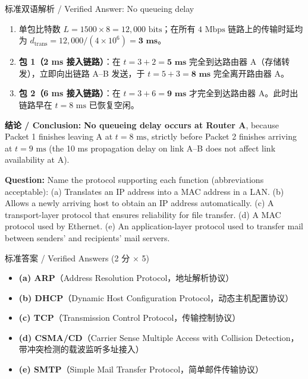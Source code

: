 \begin{StudySolution}{标准双语解析 / Verified Answer: No queueing delay}
\begin{enumerate}
\item 单包比特数 $L = 1500 \times 8 = 12{,}000\text{ bits}$；在所有 $4\text{ Mbps}$ 链路上的传输时延均为 $d_{\text{trans}} = 12{,}000 / (4\times 10^6) = \mathbf{3\text{ ms}}$。
\item \textbf{包 1（2 ms 接入链路）}：在 $t = 3 + 2 = \mathbf{5\text{ ms}}$ 完全到达路由器 A（存储转发），立即向出链路 A–B 发送，于 $t = 5 + 3 = \mathbf{8\text{ ms}}$ 完全离开路由器 A。
\item \textbf{包 2（6 ms 接入链路）}：在 $t = 3 + 6 = \mathbf{9\text{ ms}}$ 才完全到达路由器 A。此时出链路早在 $t=8\text{ ms}$ 已恢复空闲。
\end{enumerate}
\textbf{结论 / Conclusion:} \textbf{No queueing delay occurs at Router A}, because Packet 1 finishes leaving A at $t=8\text{ ms}$, strictly before Packet 2 finishes arriving at $t=9\text{ ms}$ (the 10 ms propagation delay on link A--B does not affect link availability at A).
\end{StudySolution}



\textbf{Question:} Name the protocol supporting each function (abbreviations acceptable):
(a) Translates an IP address into a MAC address in a LAN.
(b) Allows a newly arriving host to obtain an IP address automatically.
(c) A transport-layer protocol that ensures reliability for file transfer.
(d) A MAC protocol used by Ethernet.
(e) An application-layer protocol used to transfer mail between senders' and recipients' mail servers.

\begin{StudySolution}{标准答案 / Verified Answers (2 分 $\times$ 5)}
\begin{itemize}
\item \textbf{(a) ARP}（Address Resolution Protocol，地址解析协议）
\item \textbf{(b) DHCP}（Dynamic Host Configuration Protocol，动态主机配置协议）
\item \textbf{(c) TCP}（Transmission Control Protocol，传输控制协议）
\item \textbf{(d) CSMA/CD}（Carrier Sense Multiple Access with Collision Detection，带冲突检测的载波监听多址接入）
\item \textbf{(e) SMTP}（Simple Mail Transfer Protocol，简单邮件传输协议）
\end{itemize}
\end{StudySolution}


